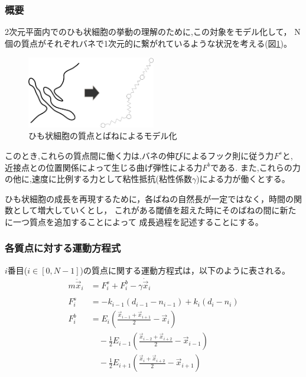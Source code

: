 \subsubsection{概要}

2次元平面内でのひも状細胞の挙動の理解のために,この対象をモデル化して，
N個の質点がそれぞれバネで1次元的に繋がれているような状況を考える(図\ref{fig:model})。

\begin{figure}[H]
  \begin{center}
    \includegraphics[width=0.5\textwidth]{../img/model.pdf}
    \caption{ひも状細胞の質点とばねによるモデル化}
    \label{fig:model}
  \end{center}
\end{figure}

このとき,これらの質点間に働く力は,バネの伸びによるフック則に従う力$F^{s}$と,
近接点との位置関係によって生じる曲げ弾性による力$F^{b}$である.
また,これらの力の他に,速度に比例する力として粘性抵抗(粘性係数$\gamma$)による力が働くとする。

ひも状細胞の成長を再現するために，各ばねの自然長が一定ではなく，時間の関数として増大していくとし，
これがある閾値を超えた時にそのばねの間に新たに一つ質点を追加することによって
成長過程を記述することにする。

\subsubsection{各質点に対する運動方程式}

$i$番目($i \in [0, N-1]$)の質点に関する運動方程式は，以下のように表される。
\begin{align*}
  m\ddot{\vec{x}}_{i} &= F_{i}^{s} + F_{i}^{b} - \gamma \dot{\vec{x}}_{i}
  \tag{1}\label{e1} \\
  \\
  F_{i}^{s} &= - k_{i-1}(d_{i-1} - n_{i-1}) + k_{i}(d_{i} - n_{i}) 
  \tag{1.a}\label{e1a} \\
  F_{i}^{b} &= E_i\left(\frac{\vec{x}_{i-1} + \vec{x}_{i+1}}{2} - \vec{x}_{i}\right) \\
  &\quad  - \frac{1}{2} E_{i-1}\left(\frac{\vec{x}_{i-2} + \vec{x}_{i+2}}{2} - \vec{x}_{i-1}\right) \\
  &\quad - \frac{1}{2}E_{i+1}\left(\frac{\vec{x}_{i} + \vec{x}_{i+2}}{2} - \vec{x}_{i+1}\right)
  \tag{1.b}\label{e1b}
\end{align*}

